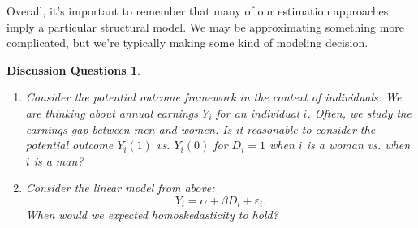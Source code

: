 \documentclass{tufte-handout}
\theoremstyle{break}
\newtheorem{discussion}{Discussion Questions}
\begin{document}
Overall, it's important to remember that many of our estimation approaches imply a particular structural model. We may be approximating something more complicated, but we're typically making some kind of modeling decision.

\begin{boxK}
  \begin{discussion}
    \begin{enumerate}
      \item Consider the potential outcome framework in the context of individuals. We are thinking about annual earnings $Y_{i}$ for an individual $i$. 
      Often, we study the earnings gap between men and women. Is it reasonable to consider the potential outcome $Y_{i}(1)$ vs. $Y_{i}(0)$ for $D_{i} =1$ when $i$ is a woman vs. when $i$ is a man?
      \item Consider the linear model  from above:
      \begin{equation*}
  Y_{i} = \alpha + \beta D_{i} + \varepsilon_{i}.
      \end{equation*}
      When would we expected homoskedasticity to hold? 
    \end{enumerate}
  \end{discussion}
\end{boxK}




\end{document}
